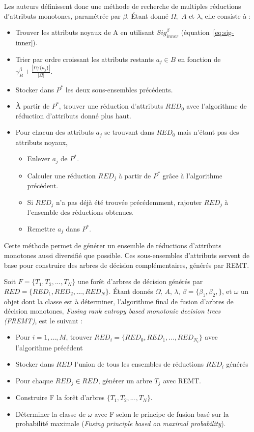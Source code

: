 \documentclass[a4paper]{article}
\renewcommand{\eqref}[1]{équation~\ref{#1}}
\begin{document}
\noindent Les auteurs définissent donc une méthode de recherche de multiples réductions
d'attributs monotones, paramétrée par $\beta$. Étant donné $\Omega$,~$A$ et
$\lambda$, elle consiste à :
\begin{itemize}
    \item Trouver les attributs noyaux de A en utilisant $Sig^{\beta}_{inner}$
        (\eqref{eq:sig-inner}).
    \item Trier par ordre croissant les attributs restants $a_j \in B$ en fonction de
        $\gamma^{\beta}_{B} + \frac{|\Omega / \{a_j\}|}{|\Omega|}$.
    \item Stocker dans $P^*$ les deux sous-ensembles précédents.
    \item À partir de $P^*$, trouver une réduction
d'attributs $RED_0$ avec l'algorithme de réduction d'attributs donné plus haut.
    \item Pour chacun des attributs $a_j$ se trouvant dans $RED_0$ mais n'étant
        pas des attributs noyaux,
    \begin{itemize}
        \item Enlever $a_j$ de $P^*$.
        \item Calculer une réduction $RED_j$ à partir de $P^*$ grâce à
            l'algorithme précédent.
        \item Si $RED_j$ n'a pas déjà été trouvée précédemment, rajouter $RED_j$
            à l'ensemble des réductions obtenues.
        \item Remettre $a_j$ dans $P^*$.
    \end{itemize}
\end{itemize}

\noindent Cette méthode permet de générer un ensemble de réductions d'attributs
monotones aussi diversifié que possible. Ces sous-ensembles d'attributs servent
de base pour construire des arbres de décision complémentaires, générés par
REMT. 

Soit $F = \{T_1,T_2,...,T_N\}$ une forêt d'arbres de décision générés par $RED =
\{RED_1,RED_2,...,RED_N\}$. Étant donnés $\Omega$, $A$, $\lambda$,
$\beta = \{\beta_1,\beta_2,\}$, et $\omega$ un objet dont la classe est à
déterminer, l'algorithme final de fusion d'arbres de décision
monotones, \emph{Fusing rank entropy based monotonic decision trees (FREMT)},
est le suivant :
\begin{itemize}
    \item Pour $i=1,...,M$, trouver $RED_i = \{RED_0,RED_1,...,RED_{N_i}\}$ avec
        l'algorithme précédent
    \item Stocker dans $RED$ l'union de tous les ensembles de réductions $RED_i$ générés
    \item Pour chaque $RED_j \in RED$, générer un arbre $T_j$ avec REMT.
    \item Construire F la forêt d'arbres $\{T_1,T_2,...,T_N\}$.
    \item Déterminer la classe de $\omega$ avec F selon le principe de fusion
        basé sur la probabilité maximale (\emph{Fusing principle based on
        maximal probability}). \\
\end{itemize}
\end{document}
